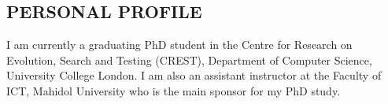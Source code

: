 \documentclass[margin, 10pt]{res} %
\begin{document}
\begin{resume}

 



\section{PERSONAL PROFILE}  

I am currently a graduating PhD student in the Centre for Research on Evolution, Search and Testing (CREST), Department of Computer Science, University College London. I am also an assistant instructor at the Faculty of ICT, Mahidol University who is the main sponsor for my PhD study.





\end{resume}
\end{document}
